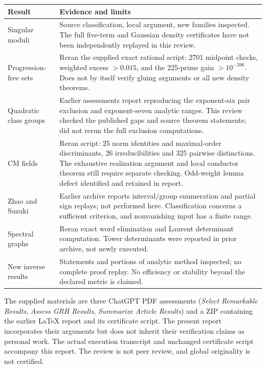 \documentclass[11pt,letterpaper]{article}
\renewcommand{\arraystretch}{1.18}
\begin{document}
{\small\renewcommand{\arraystretch}{1.0}\begin{tabularx}{\linewidth}{@{}p{.235\linewidth}Y@{}}\toprule
\textbf{Result}&\textbf{Evidence and limits}\\\midrule
Singular moduli & Source classification, local argument, new families inspected. The full five-term and Gaussian density certificates have not been independently replayed in this review.\\
Progression-free sets & Reran the supplied exact rational script: 2701 midpoint checks, weighted excess $>0.015$, and the 225-prime gain $>10^{-596}$. Does not by itself verify gluing arguments or all new density theorems.\\
Quadratic class groups & Earlier assessments report reproducing the exponent-six pair exclusion and exponent-seven analytic ranges. This review checked the published gaps and source theorem statements; did not rerun the full exclusion computations.\\
CM fields & Reran script: 25 norm identities and maximal-order discriminants, 26 irreducibilities and 325 pairwise distinctions. The exhaustive realization argument and local conductor theorem still require separate checking. Odd-weight lemma defect identified and retained in report.\\
Zhao and Suzuki & Earlier archive reports interval/group enumeration and partial sign replays; not performed here. Classification concerns a sufficient criterion, and nonvanishing input has a finite range.\\
Spectral graphs & Reran exact word elimination and Laurent determinant computation. Tower determinants were reported in prior archive, not newly executed.\\
New inverse results & Statements and portions of analytic method inspected; no complete proof replay. No efficiency or stability beyond the declared metric is claimed.\\\bottomrule\end{tabularx}}

The supplied materials are three ChatGPT PDF assessments (\emph{Select Remarkable Results}, \emph{Assess GRH Results}, \emph{Summarize Article Results}) and a ZIP containing the earlier LaTeX report and its certificate script. The present report incorporates their arguments but does not inherit their verification claims as personal work. The actual execution transcript and unchanged certificate script accompany this report. The review is not peer review, and global originality is not certified.
\end{document}
